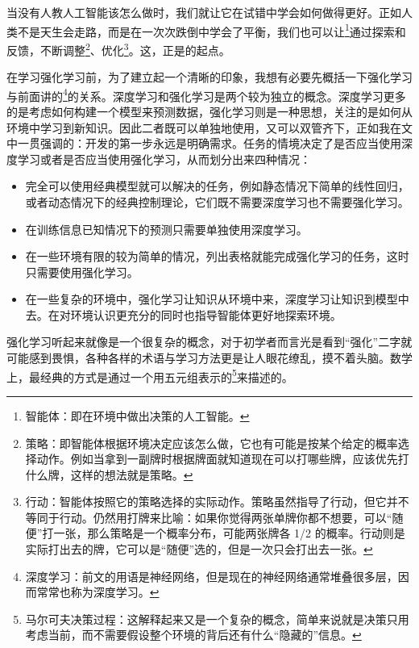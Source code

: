 当没有人教人工智能该怎么做时，我们就让它在试错中学会如何做得更好。正如人类不是天生会走路，而是在一次次跌倒中学会了平衡，我们也可以让\footnote{智能体：即在环境中做出决策的人工智能。}通过探索和反馈，不断调整\footnote{策略：即智能体根据环境决定应该怎么做，它也有可能是按某个给定的概率选择动作。例如当拿到一副牌时根据牌面就知道现在可以打哪些牌，应该优先打什么牌，这样的想法就是策略。}、优化\footnote{行动：智能体按照它的策略选择的实际动作。策略虽然指导了行动，但它并不等同于行动。仍然用打牌来比喻：如果你觉得两张单牌你都不想要，可以“随便”打一张，那么策略是一个概率分布，可能两张牌各 1/2 的概率。行动则是实际打出去的牌，它可以是“随便”选的，但是一次只会打出去一张。}。这，正是的起点。

在学习强化学习前，为了建立起一个清晰的印象，我想有必要先概括一下强化学习与前面讲的\footnote{深度学习：前文的用语是神经网络，但是现在的神经网络通常堆叠很多层，因而常常也称为深度学习。}的关系。深度学习和强化学习是两个较为独立的概念。深度学习更多的是考虑如何构建一个模型来预测数据，强化学习则是一种思想，关注的是如何从环境中学习到新知识。因此二者既可以单独地使用，又可以双管齐下，正如我在文中一贯强调的：开发的第一步永远是明确需求。任务的情境决定了是否应当使用深度学习或者是否应当使用强化学习，从而划分出来四种情况：
\begin{itemize}
    \item 完全可以使用经典模型就可以解决的任务，例如静态情况下简单的线性回归，或者动态情况下的经典控制理论，它们既不需要深度学习也不需要强化学习。
    \item 在训练信息已知情况下的预测只需要单独使用深度学习。
    \item 在一些环境有限的较为简单的情况，列出表格就能完成强化学习的任务，这时只需要使用强化学习。
    \item 在一些复杂的环境中，强化学习让知识从环境中来，深度学习让知识到模型中去。在对环境认识更充分的同时也指导智能体更好地探索环境。
\end{itemize}

强化学习听起来就像是一个很复杂的概念，对于初学者而言光是看到“强化”二字就可能感到畏惧，各种各样的术语与学习方法更是让人眼花缭乱，摸不着头脑。数学上，最经典的方式是通过一个用五元组表示的\footnote{马尔可夫决策过程：这解释起来又是一个复杂的概念，简单来说就是决策只用考虑当前，而不需要假设整个环境的背后还有什么“隐藏的”信息。}来描述的。

